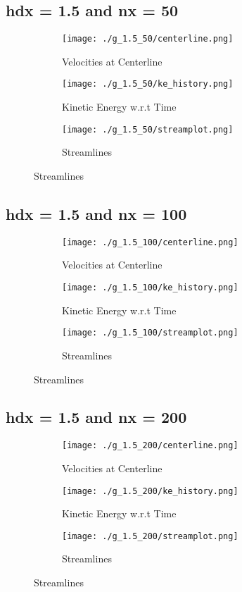 \documentclass[12pt, a4paper]{report}
\begin{document}
\subsection{hdx = 1.5 and nx = 50}
\begin{figure}[H]
\begin{subfigure}{0.5\textwidth}
	\texttt{[image: ./g\_1.5\_50/centerline.png]}
	\caption{Velocities at Centerline}
\end{subfigure}
\begin{subfigure}{0.5\textwidth}
	\texttt{[image: ./g\_1.5\_50/ke\_history.png]}
	\caption{Kinetic Energy w.r.t Time}
\end{subfigure}
\medskip
\begin{subfigure}{\textwidth}
	\centering
	\texttt{[image: ./g\_1.5\_50/streamplot.png]}
	\caption{Streamlines}
\end{subfigure}
\end{figure}

\subsection{hdx = 1.5 and nx = 100}
\begin{figure}[H]
\begin{subfigure}{0.5\textwidth}
	\texttt{[image: ./g\_1.5\_100/centerline.png]}
	\caption{Velocities at Centerline}
\end{subfigure}
\begin{subfigure}{0.5\textwidth}
	\texttt{[image: ./g\_1.5\_100/ke\_history.png]}
	\caption{Kinetic Energy w.r.t Time}
\end{subfigure}
\medskip
\begin{subfigure}{\textwidth}
	\texttt{[image: ./g\_1.5\_100/streamplot.png]}
	\caption{Streamlines}
\end{subfigure}
\end{figure}

\subsection{hdx = 1.5 and nx = 200}
\begin{figure}[H]
\begin{subfigure}{0.5\textwidth}
	\texttt{[image: ./g\_1.5\_200/centerline.png]}
	\caption{Velocities at Centerline}
\end{subfigure}
\begin{subfigure}{0.5\textwidth}
	\texttt{[image: ./g\_1.5\_200/ke\_history.png]}
	\caption{Kinetic Energy w.r.t Time}
\end{subfigure}
\medskip
\begin{subfigure}{\textwidth}
	\texttt{[image: ./g\_1.5\_200/streamplot.png]}
	\caption{Streamlines}
\end{subfigure}
\end{figure}
\end{document}
